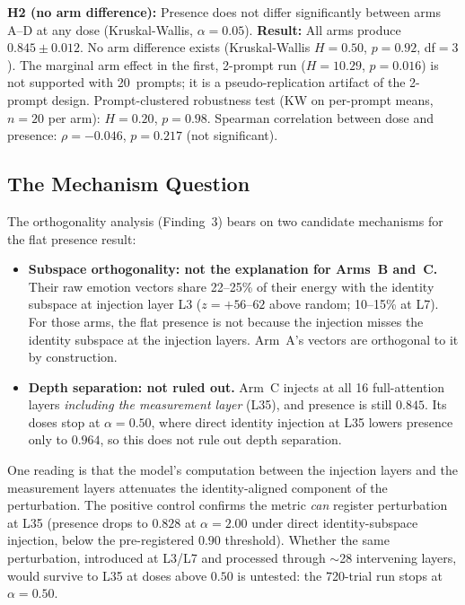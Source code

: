 \documentclass[11pt,a4paper]{article}
\begin{document}
\textbf{H2 (no arm difference):} Presence does not differ significantly
between arms A--D at any dose (Kruskal-Wallis, $\alpha = 0.05$).
\textbf{Result:} All arms produce $0.845 \pm 0.012$. No arm difference
exists (Kruskal-Wallis $H{=}0.50$, $p{=}0.92$, df$=3$). The marginal
arm effect in the first, 2-prompt run ($H{=}10.29$, $p{=}0.016$) is not
supported with 20~prompts; it is a pseudo-replication artifact of the
2-prompt design. Prompt-clustered robustness test (KW on per-prompt means,
$n{=}20$ per arm): $H{=}0.20$, $p{=}0.98$. Spearman correlation between
dose and presence: $\rho{=}{-}0.046$, $p{=}0.217$ (not significant).

\subsection{The Mechanism Question}

The orthogonality analysis (Finding~3) bears on two candidate mechanisms
for the flat presence result:

\begin{itemize}[nosep]
  \item \textbf{Subspace orthogonality: not the explanation for Arms~B
    and~C.} Their raw emotion vectors share
    22--25\% of their energy with the identity subspace at injection
    layer L3 ($z{=}{+}56$--$62$ above random; 10--15\% at L7). For those
    arms, the flat presence is not because the injection misses the
    identity subspace at the injection layers. Arm~A's vectors are
    orthogonal to it by construction.
  \item \textbf{Depth separation: not ruled out.} Arm~C injects at all 16
    full-attention layers \emph{including the measurement layer} (L35),
    and presence is still $0.845$. Its doses stop at $\alpha = 0.50$,
    where direct identity injection at L35 lowers presence only to
    $0.964$, so this does not rule out depth separation.
\end{itemize}

One reading is that the model's computation between the injection layers
and the measurement layers attenuates the identity-aligned component of
the perturbation. The positive control confirms the metric \emph{can}
register perturbation at L35 (presence drops to $0.828$ at
$\alpha = 2.00$ under direct identity-subspace injection, below the
pre-registered $0.90$ threshold).
Whether the same perturbation, introduced at L3/L7 and processed through
$\sim$28 intervening layers, would survive to L35 at doses above $0.50$ is
untested: the 720-trial run stops at $\alpha = 0.50$.
\end{document}
